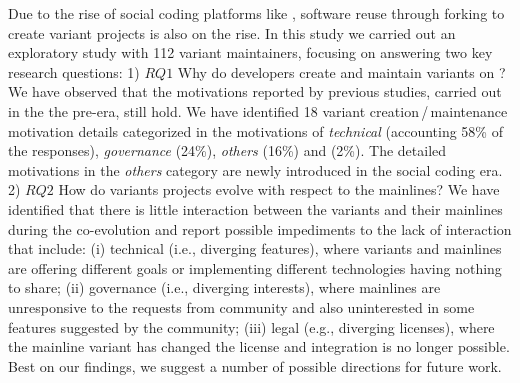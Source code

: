 Due to the rise of social coding platforms like \gh, software reuse through forking to create variant projects is also on the rise. 
In this study we carried out an exploratory study with 112 variant maintainers, focusing on answering two key research questions: 1) $RQ1$ Why do developers create and maintain variants on \gh?  
We have observed that the motivations reported by previous studies, carried out in the the pre-\gh era, still hold. We have identified 18 variant creation\,/\,maintenance motivation details categorized in the motivations of \emph{technical} (accounting 58\% of the responses), \emph{governance} (24\%), \emph{others} (16\%) and  (2\%). The detailed motivations in the \emph{others} category are newly introduced in the social coding era. 
2) $RQ2$ How do variants projects evolve with respect to the mainlines?
We have identified that there is little interaction between the variants and their mainlines during the co-evolution and report possible impediments to the lack of interaction that include: (i) technical (i.e., diverging features), where variants and mainlines are offering different goals or implementing different technologies having nothing to share; (ii) governance (i.e., diverging interests), where mainlines are unresponsive to the requests from community and also uninterested in some features suggested by the community; (iii) legal (e.g., diverging licenses), where the mainline variant has changed the license and integration is no longer possible. Best on our findings, we suggest a number of possible directions for future work. 

